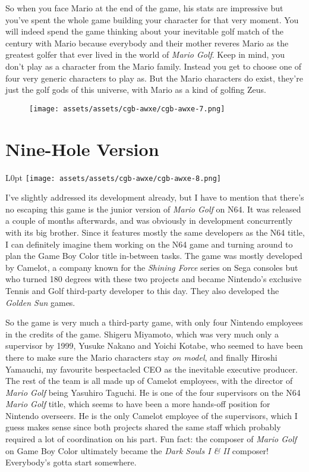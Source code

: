 \documentclass{book}
\begin{document}
So when you face Mario at the end of the game, his stats are impressive but you’ve spent the whole game building your character for that very moment. You will indeed spend the game thinking about your inevitable golf match of the century with Mario because everybody and their mother reveres Mario as the greatest golfer that ever lived in the world of \emph{Mario Golf}. Keep in mind, you don’t play as a character from the Mario family. Instead you get to choose one of four very generic characters to play as. But the Mario characters do exist, they’re just the golf gods of this universe, with Mario as a kind of golfing Zeus.

\begin{figure}[hbt]
\vskip 10pt
\centering \texttt{[image: assets/assets/cgb-awxe/cgb-awxe-7.png]}
\vskip 6pt
\end{figure}

\FloatBarrier\needspace{10mm}\section*{Nine-Hole Version}\nopagebreak[4]

\begin{wrapfigure}{L}{0pt} \texttt{[image: assets/assets/cgb-awxe/cgb-awxe-8.png]}\end{wrapfigure}
I’ve slightly addressed its development already, but I have to mention that there’s no escaping this game is the junior version of \emph{Mario Golf} on N64. It was released a couple of months afterwards, and was obviously in development concurrently with its big brother. Since it features mostly the same developers as the N64 title, I can definitely imagine them working on the N64 game and turning around to plan the Game Boy Color title in-between tasks. The game was mostly developed by Camelot, a company known for the \emph{Shining Force} series on Sega consoles but who turned 180 degrees with these two projects and became Nintendo’s exclusive Tennis and Golf third-party developer to this day. They also developed the \emph{Golden Sun} games.

So the game is very much a third-party game, with only four Nintendo employees in the credits of the game. Shigeru Miyamoto, which was very much only a supervisor by 1999, Yusuke Nakano and Yoichi Kotabe, who seemed to have been there to make sure the Mario characters stay \emph{on model}, and finally Hiroshi Yamauchi, my favourite bespectacled CEO as the inevitable executive producer. The rest of the team is all made up of Camelot employees, with the director of \emph{Mario Golf} being Yasuhiro Taguchi. He is one of the four supervisors on the N64 \emph{Mario Golf} title, which seems to have been a more hands-off position for Nintendo overseers. He is the only Camelot employee of the supervisors, which I guess makes sense since both projects shared the same staff which probably required a lot of coordination on his part. Fun fact: the composer of \emph{Mario Golf} on Game Boy Color ultimately became the \emph{Dark Souls I \& II} composer! Everybody’s gotta start somewhere.
\end{document}
